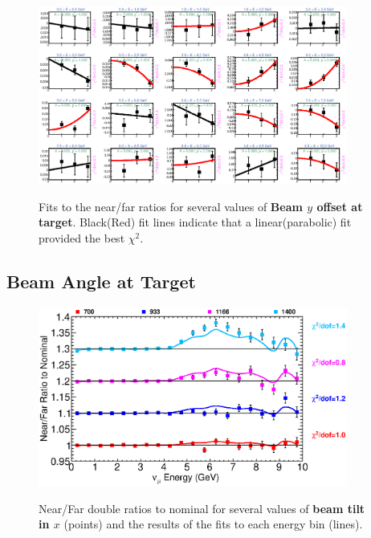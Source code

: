 \begin{figure}[hb]
  \begin{center}
    {\includegraphics[width=4.0in]{figures/NominalY_nof_fits.eps}}
  \end{center}
\caption{ Fits to the near/far ratios for several values of {\bf Beam $y$ offset at target}. Black(Red) fit lines indicate that a linear(parabolic) fit provided the best $\chi^2$. }
\end{figure}

\clearpage
\subsection{Beam Angle at Target}

\begin{figure}[ht]
  \begin{center}
    {\includegraphics[width=4.0in]{figures/Tilt_t_nof_summary.eps}}
  \end{center}
\caption{ Near/Far double ratios to nominal for several values of {\bf beam tilt in $x$} (points) and the results of the fits to each energy bin (lines).}
\end{figure}

